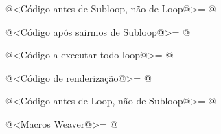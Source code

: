\iniciocodigo
@<Código antes de Subloop, não de Loop@>=
@
\fimcodigo

\iniciocodigo
@<Código após sairmos de Subloop@>=
@
\fimcodigo

\iniciocodigo
@<Código a executar todo loop@>=
@
\fimcodigo

\iniciocodigo
@<Código de renderização@>=
@
\fimcodigo

\iniciocodigo
@<Código antes de Loop, não de Subloop@>=
@
\fimcodigo

\iniciocodigo
@<Macros Weaver@>=
@
\fimcodigo





\fim
